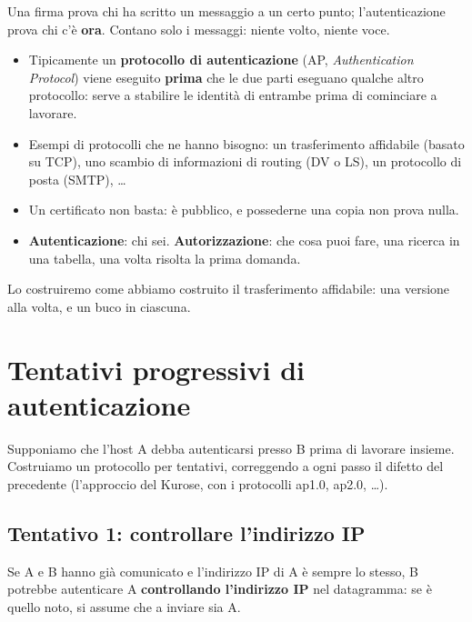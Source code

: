 Una firma prova chi ha scritto un messaggio a un certo punto; l'autenticazione prova chi c'è \textbf{ora}. Contano solo i messaggi:
niente volto, niente voce.

\begin{itemize}
    \item Tipicamente un \textbf{protocollo di autenticazione} (AP, \emph{Authentication Protocol}) viene eseguito \textbf{prima} che le due
          parti eseguano qualche altro protocollo: serve a stabilire le identità di entrambe prima di cominciare a lavorare.
    \item Esempi di protocolli che ne hanno bisogno: un trasferimento affidabile (basato su TCP), uno scambio di informazioni di routing (DV o
          LS), un protocollo di posta (SMTP), \dots
    \item Un certificato non basta: è pubblico, e possederne una copia non prova nulla.
    \item \textbf{Autenticazione}: chi sei. \textbf{Autorizzazione}: che cosa puoi fare, una ricerca in una tabella, una volta risolta la
          prima domanda.
\end{itemize}

Lo costruiremo come abbiamo costruito il trasferimento affidabile: una versione alla volta, e un buco in ciascuna.

\section{Tentativi progressivi di autenticazione}

Supponiamo che l'host A debba autenticarsi presso B prima di lavorare insieme. Costruiamo un protocollo per tentativi, correggendo a ogni
passo il difetto del precedente (l'approccio del Kurose, con i protocolli ap1.0, ap2.0, \dots).

\subsection{Tentativo 1: controllare l'indirizzo IP}

Se A e B hanno già comunicato e l'indirizzo IP di A è sempre lo stesso, B potrebbe autenticare A \textbf{controllando l'indirizzo IP} nel
datagramma: se è quello noto, si assume che a inviare sia A.


